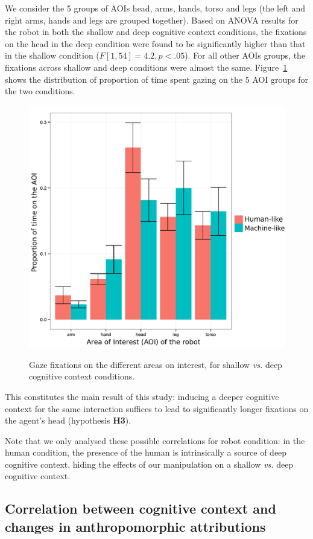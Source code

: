 \documentclass[lettersize, noapacite, twoside, HRI]{apa_HRI}
\newcommand{\vs}{\textit{vs.}\xspace}
\newcommand{\h}[1]{\textbf{H#1}\xspace}
\begin{document}
We consider the 5 groups of AOIs {\sf head}, {\sf arms}, {\sf hands}, {\sf
torso} and {\sf legs} (the left and right arms, hands and legs are grouped
together). Based on ANOVA results for the robot in both the shallow and deep
cognitive context conditions, the fixations on the head in the deep condition
were found to be significantly higher than that in the shallow condition
($F[1,54] = 4.2, p < .05$). For all other AOIs groups, the fixations across
shallow and deep conditions were almost the same. Figure~\ref{h3} shows the
distribution of proportion of time spent gazing on the 5 AOI groups for the two
conditions.

\begin{figure}[ht!]
    \centering
    \includegraphics[width=0.6\columnwidth]{GazeHighLow}\label{GazeHighLow}
    \caption{Gaze fixations on the different areas on interest, for shallow \vs
    deep cognitive context conditions.}
    \label{h3}
\end{figure}

This constitutes the main result of this study: inducing a deeper cognitive
context for the same interaction suffices to lead to significantly longer
fixations on the agent's head (hypothesis \h{3}).

Note that we only analysed these possible correlations for robot condition: in
the human condition, the presence of the human is intrinsically a source of deep
cognitive context, hiding the effects of our manipulation on a shallow \vs deep
cognitive context.


\subsection{Correlation between cognitive context and changes in anthropomorphic
attributions}
\end{document}
